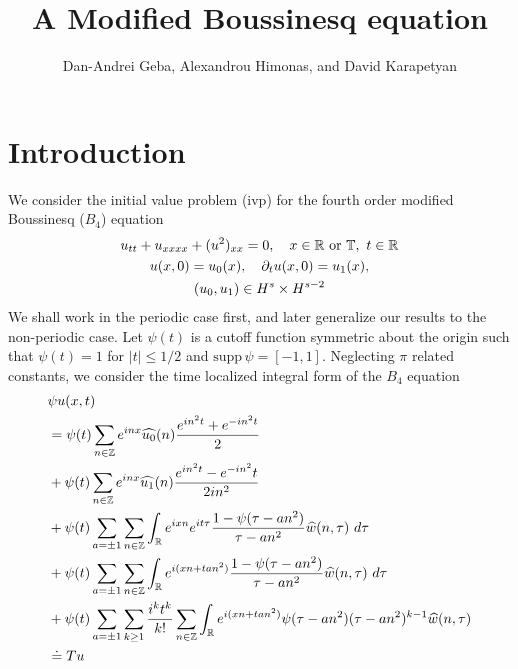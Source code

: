 \documentclass[12pt,reqno]{amsart}
\numberwithin{equation}{section}  %
\newcommand{\rr}{\mathbb{R}}
\newcommand{\zz}{\mathbb{Z}}
\newcommand{\ci}{\mathbb{T}}
\newcommand{\wh}{\widehat}
\newcommand{\p}{\partial}
\begin{document}
\title{A Modified Boussinesq equation}
\author{Dan-Andrei Geba, Alexandrou Himonas, and David Karapetyan}
\address{Department of Mathematics, University of Rochester, Rochester, NY 14627}
\address{Department of Mathematics, University of Notre Dame, Notre Dame, IN 46556}
\address{Department of Mathematics, University of Notre Dame, Notre Dame, IN 46556}
\date{}
%
%
\maketitle
%
%
\section{Introduction}
%
We consider the initial value problem (ivp) for the fourth order modified Boussinesq
($B_4$) equation 
\begin{gather}
  u_{tt}   + u_{xxxx} + (u^2)_{xx} = 0, \quad x \in \rr \text{ or }
  \ci,\text{ } t \in \rr
  \label{eqn:mb-2}
  \\
  u(x,0) = u_{0}(x), \quad \p_t u(x, 0) = u_1(x), 
  \label{eqn:mb-init-data-2}
  \\
  \notag
  (u_0, u_1) \in
  H^{s}\times
  H^{s-2}
\end{gather}
%
%
We shall work in the periodic case first, and later generalize our results to
the non-periodic case. Let $\psi(t)$ is a cutoff function symmetric about the 
origin such that $\psi(t) = 1$ for $|t| \le 1/2$ and $\text{supp} \, \psi 
= [-1, 1 ]$. Neglecting $\pi$ related constants, we consider the time
localized integral form of the $B_{4}$ equation
%
\begin{align}
  & \psi u(x,t)
  \notag
  \\
  \label{main1-rel-term-1}
  & = \psi(t) \sum_{n \in \zz} e^{inx} \wh{u_{0}}(n) \frac{e^{in^{2}t} + e^{-in^{2}t}}{2} 
  \\
  \label{main1-rel-term-2}
  & + \psi(t) \sum_{n \in \zz} e^{inx}
  \wh{u_{1}}(n)\frac{e^{in^{2}t} - e^{-in^{2}}t}{2 i n^{2}} 
  \\
  \label{main1-rel-term-3}
  & + \psi(t) \sum_{a = \pm 1} \sum_{n\in \zz} \int_\rr e^{ixn}  
  e^{it \tau} \frac{ 1 - \psi(\tau -  an^{2}) 
  }{\tau -  an^{2}} \wh{w}(n, \tau) \ d \tau
  \\
  \label{main1-rel-term-4}
  & + \psi(t) \sum_{a = \pm 1} \sum_{n\in \zz} \int_\rr e^{i(xn + 
  t an^{2})}
  \frac{1- \psi(\tau -  an^{2})}{\tau -  an^{2}} \wh{w}(n, \tau) \ d \tau
  \\
  & + \psi(t) \sum_{a = \pm 1}  \sum_{k \ge 1} \frac{i^k t^k}{k!}
  \sum_{n \in \zz} \int_\rr e^{i(xn + t an^{2} )}
  \psi(\tau -  an^{2}) (\tau -  an^{2})^{k-1} \wh{w}(n, \tau)
  \\
  \label{main1-rel-term-5}
  & \doteq Tu
\end{align}
\end{document}
